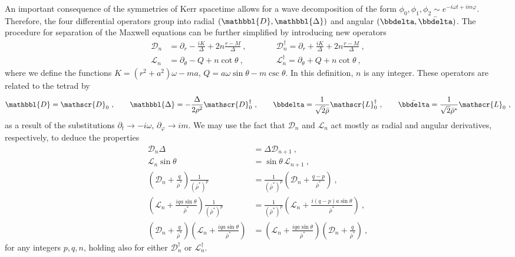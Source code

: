 An important consequence of the symmetries of Kerr spacetime allows for a wave decomposition of the form $\phi_0, \phi_1, \phi_2 \sim e^{- i \omega t + i m \varphi}$.
Therefore, the four differential operators group into radial $(\mathbbl{D}, \mathbbl{\Delta})$ and angular $(\bbdelta, \bar{\bbdelta})$. The procedure for separation of the Maxwell equations can be further simplified by introducing new operators
\begin{equation}
    \begin{alignedat}{3}
        \mathscr{D}_n &= \partial_r - \frac{i K}{\Delta} + 2n \frac{r-M}{\Delta} ~,\qquad && \mathscr{D}_n^\dagger = \partial_r + \frac{i K}{\Delta} + 2n \frac{r-M}{\Delta} ~,\\
        \mathscr{L}_n &= \partial_\theta - Q + n \cot\theta ~,\qquad && \mathscr{L}_n^\dagger = \partial_\theta + Q + n \cot\theta ~,
    \end{alignedat}
\end{equation}
where we define the functions $K=(r^2+a^2)\omega - m a$, $Q = a \omega \sin\theta - m \csc\theta$.
In this definition, $n$ is any integer.
These operators are related to the tetrad by
\begin{align}
    \label{eq3:ChadrasekharOperators}
    \mathbbl{D} = \mathscr{D}_0 ~,\qquad \mathbbl{\Delta} = - \frac{\Delta}{2 \rho^2 }\mathscr{D}^\dagger_0 ~,\qquad \bbdelta = \frac{1}{\sqrt{2} \bar{\rho}} \mathscr{L}^\dagger_0 ~,\qquad \bar\bbdelta = \frac{1}{\sqrt{2} \bar{\rho}^*} \mathscr{L}_0 ~,
\end{align}
as a result of the substitutions $\partial_t\rightarrow-i \omega$, $\partial_\varphi\rightarrow i m$.
We may use the fact that $\mathscr{D}_n$ and $\mathscr{L}_n$ act mostly as radial and angular derivatives, respectively, to deduce the properties
\begin{subequations}
    \begin{align}
        \label{eq3:propDeltaD}
        \mathscr{D}_n \Delta &= \Delta \mathscr{D}_{n+1} ~, \\[0.15cm]
        \label{eq3:propSinL}
        \mathscr{L}_n \sin\theta &= \sin\theta\, \mathscr{L}_{n+1} ~, \\[0.15cm]
        \label{eq3:propBarRhoD}
        \left(\mathscr{D}_n + \frac{q}{\bar{\rho}^*} \right) \frac{1}{(\bar{\rho}^*)^p} &= 
        \frac{1}{(\bar{\rho}^*)^p} \left(\mathscr{D}_n + \frac{q-p}{\bar{\rho}^*} \right) ~, \\[0.15cm]
        \label{eq3:propBarRhoL}
        \left(\mathscr{L}_n + \frac{i q a \sin\theta}{\bar{\rho}^*} \right) \frac{1}{(\bar{\rho}^*)^p} &= 
        \frac{1}{(\bar{\rho}^*)^p} \left(\mathscr{L}_n + \frac{i (q-p) a \sin\theta}{\bar{\rho}^*} \right) ~, \\[0.15cm]
        \label{eq3:propCommutLD}
        \left(\mathscr{D}_n + \frac{q}{\bar{\rho}^*} \right) 
        \left(\mathscr{L}_n + \frac{i q a \sin\theta}{\bar{\rho}^*} \right) &= 
        \left(\mathscr{L}_n + \frac{i q a \sin\theta}{\bar{\rho}^*} \right)
        \left(\mathscr{D}_n + \frac{q}{\bar{\rho}^*} \right) ~,
    \end{align}
\end{subequations}
for any integers $p,q,n$, holding also for either $\mathscr{D}^\dagger_n$ or $\mathscr{L}^\dagger_n$.

